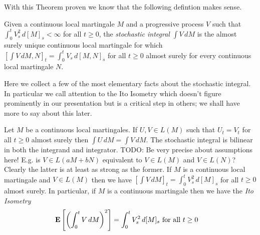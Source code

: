 With this Theorem proven we know that the following defintion makes sense.
\begin{defn}Given a continuous local martingale $M$ and a progressive process $V$ such that $\int_0^t V^2_s \, d[M]_s < \infty$ for all $t \geq 0$, the \emph{stochastic integral} $\int V \, dM$ is the almost surely unique continuous local martingale for which $[\int V \, dM, N]_t = \int_0^t V_s \, d[M,N]_s$ for all $t \geq 0$ almost surely for every continuous local martingale $N$.
\end{defn}

Here we collect a few of the most elementary facts about the stochastic integral.  In particular we call attention to the Ito Isometry which doesn't figure prominently in our presentation but is a critical step in others; we shall have more to say about this later.  
\begin{lem}\label{BasicPropertiesStochasticIntegralContinuousMartingale}Let $M$ be a continuous local martingales.  If $U,V \in L(M)$ such that $U_t=V_t$ for all $t \geq 0$ almost surely then $\int U \, dM = \int V \, dM$.  The stochastic integral is bilinear in both the integrand and integrator.
TODO: Be very precise about assumptions here!  E.g. is $V \in L(aM + bN)$ equivalent to $V \in L(M)$ and $V \in L(N)$?  Clearly the latter is at least as strong as the former.
If $M$ is a continuous local martingale and $V \in L(M)$ then we have $[\int V \, dM]_t = \int_0^t V^2_s \, d[M]_s$ for all $t \geq 0$ almost surely.  In particular, if $M$ is a continuous martingale then we have the \emph{Ito Isometry} 
\begin{align*}
\textbf{E}\left[\left(\int_0^t V \, dM\right)^2\right] &= \int_0^t V_s^2 \, d[M]_s \text{ for all $t \geq 0$}
\end{align*}
\end{lem}
